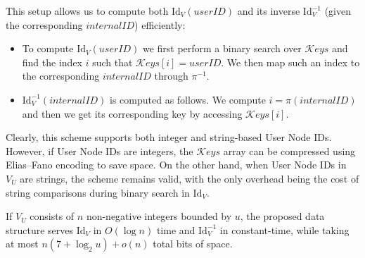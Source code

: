 This setup allows us to compute both $\mathrm{Id}_V(\mathit{userID})$ and its inverse $\mathrm{Id}_V^{-1}$ (given the corresponding $\mathit{internalID}$) efficiently:
\begin{itemize}
    \item To compute $\mathrm{Id}_V(\mathit{userID})$  we first perform a binary search over $\mathcal{K}eys$ and find the index $i$ such that $\mathcal{K}eys[i] = \mathit{userID}$. We then map such an index to the corresponding $\mathit{internalID}$ through $\pi^{-1}$.
    \item $\mathrm{Id}_V^{-1}(\mathit{internalID})$ is computed as follows. We compute $i = \pi(\mathit{internalID})$ and then we get its corresponding key by accessing $\mathcal{K}eys[i]$.
\end{itemize}

Clearly, this scheme supports both integer and string-based User Node IDs. However, if User Node IDs are integers, the $\mathcal Keys$ array can be compressed using Elias–Fano encoding to save space. On the other hand, when User Node IDs in $V_U$ are strings, the scheme remains valid, with the only overhead being the cost of string comparisons during binary search in $\mathrm{Id}_V$.

\begin{theorem}\label{thm:map}
If $V_U$ consists of $n$ non-negative integers bounded by $u$, the proposed data structure serves $\mathrm{Id}_V$ in $O(\log n)$ time and $\mathrm{Id}_V^{-1}$ in constant-time, while taking at most  $n (7 + \log_2 u) + o(n)$ total bits of space.
\end{theorem}

